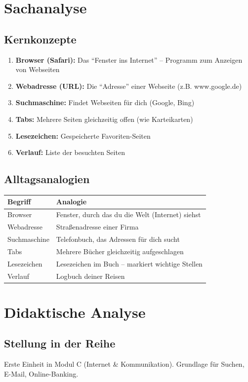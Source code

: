 \documentclass[11pt,a4paper]{article}
\begin{document}
\section{Sachanalyse}

\subsection{Kernkonzepte}
\begin{enumerate}
    \item \textbf{Browser (Safari):} Das ``Fenster ins Internet'' -- Programm zum Anzeigen von Webseiten
    \item \textbf{Webadresse (URL):} Die ``Adresse'' einer Webseite (z.B. www.google.de)
    \item \textbf{Suchmaschine:} Findet Webseiten für dich (Google, Bing)
    \item \textbf{Tabs:} Mehrere Seiten gleichzeitig offen (wie Karteikarten)
    \item \textbf{Lesezeichen:} Gespeicherte Favoriten-Seiten
    \item \textbf{Verlauf:} Liste der besuchten Seiten
\end{enumerate}

\subsection{Alltagsanalogien}
\begin{tabular}{|l|p{8cm}|}
\hline
\textbf{Begriff} & \textbf{Analogie} \\
\hline
Browser & Fenster, durch das du die Welt (Internet) siehst \\
Webadresse & Straßenadresse einer Firma \\
Suchmaschine & Telefonbuch, das Adressen für dich sucht \\
Tabs & Mehrere Bücher gleichzeitig aufgeschlagen \\
Lesezeichen & Lesezeichen im Buch -- markiert wichtige Stellen \\
Verlauf & Logbuch deiner Reisen \\
\hline
\end{tabular}

\section{Didaktische Analyse}

\subsection{Stellung in der Reihe}
Erste Einheit in Modul C (Internet \& Kommunikation). Grundlage für Suchen, E-Mail, Online-Banking.
\end{document}
